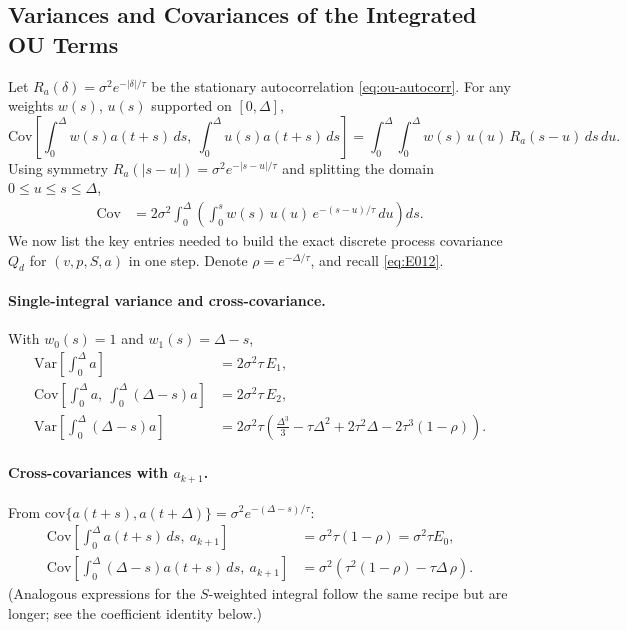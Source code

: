 \documentclass[11pt]{article}
\begin{document}
\subsection{Variances and Covariances of the Integrated OU Terms}
Let $R_a(\delta)=\sigma^2 e^{-|\delta|/\tau}$ be the stationary autocorrelation \eqref{eq:ou-autocorr}.
For any weights $w(s)$, $u(s)$ supported on $[0,\Delta]$,
\begin{equation}
\mathrm{Cov}\!\left[\int_0^\Delta w(s) a(t+s)\,ds,\ \int_0^\Delta u(s) a(t+s)\,ds\right]
= \int_0^\Delta\!\!\int_0^\Delta w(s)\,u(u)\,R_a(s-u)\,ds\,du.
\label{eq:kernel-cov}
\end{equation}
Using symmetry $R_a(|s-u|)=\sigma^2 e^{-|s-u|/\tau}$ and splitting the domain $0\le u\le s\le \Delta$,
\begin{align}
\mathrm{Cov}
&= 2\sigma^2 \int_0^\Delta \left(\int_0^s w(s)\,u(u)\,e^{-(s-u)/\tau}\,du\right) ds.
\label{eq:kernel-cov-2}
\end{align}
We now list the key entries needed to build the exact discrete process covariance $Q_d$
for $(v,p,S,a)$ in one step. Denote $\rho=e^{-\Delta/\tau}$, and recall \eqref{eq:E012}.

\paragraph{Single-integral variance and cross-covariance.}
With $w_0(s)=1$ and $w_1(s)=\Delta-s$,
\begin{align}
\mathrm{Var}\!\left[\int_0^\Delta a\right]
&= 2\sigma^2 \tau\,E_1,
\label{eq:var-I0}
\\
\mathrm{Cov}\!\left[\int_0^\Delta a,\ \int_0^\Delta (\Delta-s)a\right]
&= 2\sigma^2 \tau\,E_2,
\label{eq:cov-I0-I1}
\\
\mathrm{Var}\!\left[\int_0^\Delta (\Delta-s)a\right]
&= 2\sigma^2 \tau\left(\frac{\Delta^3}{3} - \tau\Delta^2 + 2\tau^2\Delta - 2\tau^3(1-\rho)\right).
\label{eq:var-I1}
\end{align}

\paragraph{Cross-covariances with $a_{k+1}$.}
From $\mathrm{cov}\{a(t+s),a(t+\Delta)\}=\sigma^2 e^{-(\Delta-s)/\tau}$:
\begin{align}
\mathrm{Cov}\!\left[\int_0^\Delta a(t+s)\,ds,\ a_{k+1}\right]
&= \sigma^2 \tau (1-\rho)
= \sigma^2 \tau E_0,
\label{eq:cov-I0-ak1}
\\
\mathrm{Cov}\!\left[\int_0^\Delta (\Delta-s)a(t+s)\,ds,\ a_{k+1}\right]
&= \sigma^2\left(\tau^2(1-\rho) - \tau\Delta\,\rho\right).
\label{eq:cov-I1-ak1}
\end{align}
(Analogous expressions for the $S$-weighted integral follow the same recipe but are longer; see the coefficient identity below.)
\end{document}
